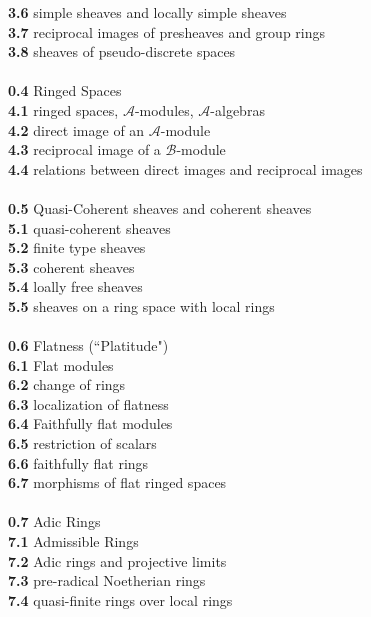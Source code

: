 \documentclass[12pt]{article}
\begin{document}
\indent \textbf{3.6} simple sheaves and locally simple sheaves \\
\indent \textbf{3.7} reciprocal images of presheaves and group rings \\ 
\indent \textbf{3.8} sheaves of pseudo-discrete spaces \\ \\
\textbf{0.4} Ringed Spaces \\
\indent \textbf{4.1} ringed spaces, $\mathcal{A}$-modules, $\mathcal{A}$-algebras \\
\indent \textbf{4.2} direct image of an $\mathcal{A}$-module \\
\indent \textbf{4.3} reciprocal image of a $\mathcal{B}$-module \\
\indent \textbf{4.4} relations between direct images and reciprocal images \\ \\
\textbf{0.5} Quasi-Coherent sheaves and coherent sheaves \\ 
\indent \textbf{5.1} quasi-coherent sheaves \\ 
\indent \textbf{5.2} finite type sheaves \\ 
\indent \textbf{5.3} coherent sheaves \\ 
\indent \textbf{5.4} loally free sheaves \\ 
\indent \textbf{5.5} sheaves on a ring space with local rings \\ \\
\textbf{0.6} Flatness (``Platitude")\\
\indent \textbf{6.1} Flat modules \\ 
\indent \textbf{6.2} change of rings \\ 
\indent \textbf{6.3} localization of flatness \\
\indent \textbf{6.4} Faithfully flat modules \\ 
\indent \textbf{6.5} restriction of scalars \\ 
\indent \textbf{6.6} faithfully flat rings \\ 
\indent \textbf{6.7} morphisms of flat ringed spaces \\ \\
\textbf{0.7} Adic Rings \\
\indent \textbf{7.1} Admissible Rings \\
\indent \textbf{7.2} Adic rings and projective limits \\
\indent \textbf{7.3} pre-radical Noetherian rings \\ 
\indent \textbf{7.4} quasi-finite rings over local rings \\ 
\end{document}
